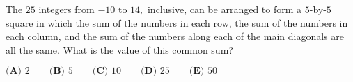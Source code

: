 The $25$ integers from $-10$ to $14,$ inclusive, can be arranged to form a $5$-by-$5$ square in which the sum of the numbers in each row, the sum of the numbers in each column, and the sum of the numbers along each of the main diagonals are all the same. What is the value of this common sum?

$\textbf{(A) }2 \qquad\textbf{(B) } 5\qquad\textbf{(C) } 10\qquad\textbf{(D) } 25\qquad\textbf{(E) } 50$